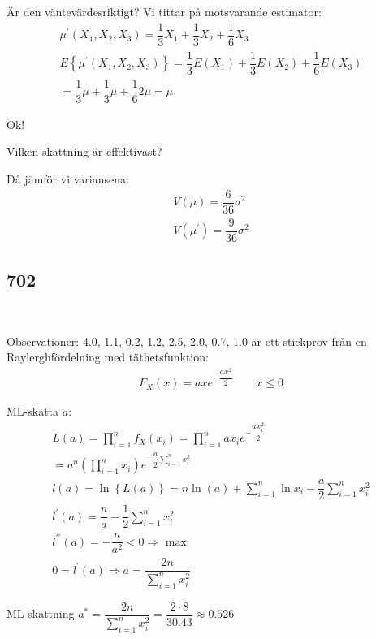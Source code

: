\noindent Är den väntevärdesriktigt? Vi tittar på motsvarande estimator:
\begin{equation*}
  \begin{gathered}
    \mu^{\prime}(X_1,X_2,X_3) = \dfrac{1}{3}X_1+\dfrac{1}{3}X_2+\dfrac{1}{6}X_3\\
    E\left\{\mu^{\prime}(X_1,X_2,X_3)\right\} = \dfrac{1}{3}E(X_1)+\dfrac{1}{3}E(X_2)+\dfrac{1}{6}E(X_3)\\
    = \dfrac{1}{3}\mu+\dfrac{1}{3}\mu+\dfrac{1}{6}2\mu = \mu
  \end{gathered}
\end{equation*}\par
\noindent Ok!
\par\bigskip
\noindent Vilken skattning är effektivast?\par
\noindent Då jämför vi variansena:
\begin{equation*}
  \begin{gathered}
    V(\mu) = \dfrac{6}{36}\sigma^2\\
    V(\mu^{\prime}) = \dfrac{9}{36}\sigma^2
  \end{gathered}
\end{equation*}
\par\bigskip
\subsection{702}\hfill\\\par
\noindent Observationer: 4.0, 1.1, 0.2, 1.2, 2.5, 2.0, 0.7, 1.0 är ett stickprov från en Raylerghfördelning med täthetsfunktion:
\begin{equation*}
  \begin{gathered}
    F_X(x) = axe^{-\dfrac{ax^2}{2}}\qquad x\leq 0
  \end{gathered}
\end{equation*}
\par\bigskip
\noindent ML-skatta $a$:
\begin{equation*}
  \begin{gathered}
    L(a) = \prod_{i=1}^{n}f_X(x_i) = \prod_{i=1}^{n}ax_ie^{-\dfrac{ax_i^2}{2}}\\
    = a^n\left(\prod_{i=1}^{n}x_i\right)e^{-\dfrac{a}{2}\sum_{i=1}^{n}x_i^2}\\
    l(a) = \ln\left\{L(a)\right\} = n\ln(a)+\sum_{i=1}^{n}\ln x_i - \dfrac{a}{2} \sum_{i=1}^{n}x_i^2\\
    l^{\prime}(a) = \dfrac{n}{a}-\dfrac{1}{2}\sum_{i=1}^{n}x_i^2\\
    l^{\prime\prime}(a) = -\dfrac{n}{a^2}<0\Rightarrow\text{ max}\\
    0 = l^{\prime}(a) \Rightarrow a = \dfrac{2n}{\sum_{i=1}^{n}x_i^2}
  \end{gathered}
\end{equation*}\par
\noindent ML skattning $a^* = \dfrac{2n}{\sum_{i=1}^{n}x_i^2} = \dfrac{2\cdot8}{30.43}\approx 0.526$
